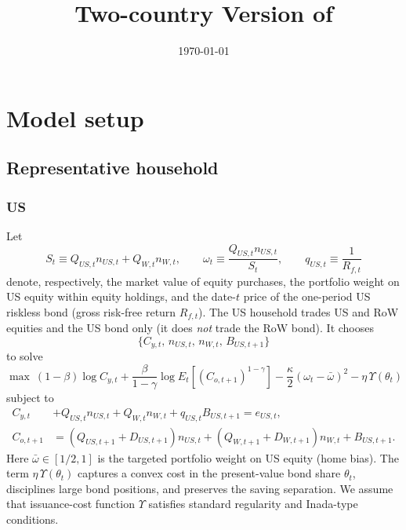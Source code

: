\documentclass[12pt]{article}
\title{Two-country Version of \cite{hirano2025technological}
}
\author{
    }
\date{\today}
\theoremstyle{plain}
\begin{document}
{
\maketitle
}
\section{Model setup}

\subsection{Representative household}

\subsubsection{US}

Let
\[
S_t \equiv Q_{US,t}n_{US,t}+Q_{W,t}n_{W,t},
\qquad
\omega_t \equiv \frac{Q_{US,t}n_{US,t}}{S_t},
\qquad
q_{US,t}\equiv \frac{1}{R_{f,t}}
\]
denote, respectively, the market value of equity purchases, the portfolio weight on US equity within equity
holdings, and the date-$t$ price of the one-period US riskless bond (gross risk-free return $R_{f,t}$).
The US household trades US and RoW equities and the US bond only (it does \emph{not} trade the RoW bond).
It chooses
\[
\{C_{y,t},\,n_{US,t},\,n_{W,t},\,B_{US,t+1}\}
\]
to solve
\[
\max
\ (1-\beta)\log C_{y,t}
+\frac{\beta}{1-\gamma}\log E_t\!\left[(C_{o,t+1})^{1-\gamma}\right]
-\frac{\kappa}{2}(\omega_t-\bar\omega)^2
-\eta\,\Upsilon(\theta_t)
\]
subject to
\begin{align*}
C_{y,t}
&+Q_{US,t}n_{US,t}+Q_{W,t}n_{W,t}
+q_{US,t}B_{US,t+1}
= e_{US,t},\\
C_{o,t+1}
&=
(Q_{US,t+1}+D_{US,t+1})n_{US,t}
+(Q_{W,t+1}+D_{W,t+1})n_{W,t}
+B_{US,t+1}.
\end{align*}
Here $\bar\omega\in[1/2,1]$ is the targeted portfolio weight on US equity (home bias). The term
$\eta\,\Upsilon(\theta_t)$ captures a convex cost in the present-value bond share $\theta_t$,
disciplines large bond positions, and preserves the saving separation. We assume that issuance-cost function $\Upsilon$ satisfies standard regularity and Inada-type conditions.
\end{document}
